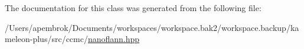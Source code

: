 The documentation for this class was generated from the following file\-:\begin{DoxyCompactItemize}
\item 
/\-Users/apembrok/\-Documents/workspaces/workspace.\-bak2/workspace.\-backup/kameleon-\/plus/src/ccmc/\hyperlink{nanoflann_8hpp}{nanoflann.\-hpp}\end{DoxyCompactItemize}
